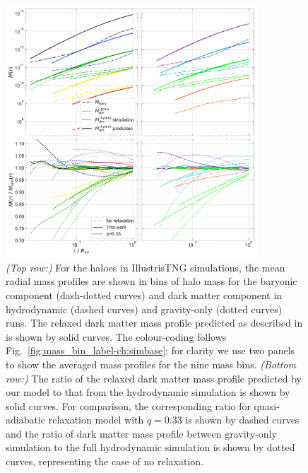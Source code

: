     
    










\begin{figure}
    \centering
    \includegraphics[width=0.84\textwidth]{plots/Mass-prof_with_demo_accu-1.pdf}
    \caption{\emph{(Top row:)} For the haloes in IllustrisTNG simulations, the mean radial mass profiles are shown in bins of halo mass for the baryonic component (dash-dotted curves) and dark matter component in hydrodynamic (dashed curves) and gravity-only (dotted curves) runs.  The relaxed dark matter mass profile predicted as described in  is shown by solid curves. The colour-coding follows Fig.~\ref{fig:mass_bin_label-ch:simbase}; for clarity we use two panels to show the averaged mass profiles for the nine mass bins. 
    \emph{(Bottom row:)} The ratio of the relaxed dark matter mass profile predicted by our model to that from the hydrodynamic simulation is shown by solid curves. For comparison, the corresponding ratio for quasi-adiabatic relaxation model with $q=0.33$ is shown by dashed curves and the ratio of dark matter mass profile between gravity-only simulation to the full hydrodynamic simulation is shown by dotted curves, representing the case of no relaxation. } 
    \label{fig:demo-fit-ch:simbase}
\end{figure}





